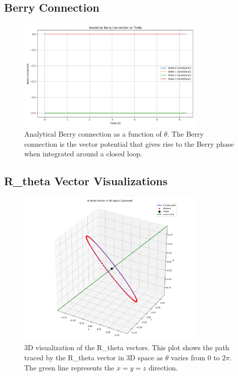\documentclass[12pt,a4paper]{article}
\begin{document}
\subsection{Berry Connection}

\begin{figure}[H]
    \centering
    \includegraphics[width=0.8\textwidth]{improved_berry_phase_results/analytical_berry_connection.png}
    \caption{Analytical Berry connection as a function of $\theta$. The Berry connection is the vector potential that gives rise to the Berry phase when integrated around a closed loop.}
    \label{fig:analytical_berry_connection}
\end{figure}

\subsection{R\_theta Vector Visualizations}

\begin{figure}[H]
    \centering
    \includegraphics[width=0.8\textwidth]{improved_berry_phase_results/r_theta_3d.png}
    \caption{3D visualization of the R\_theta vectors. This plot shows the path traced by the R\_theta vector in 3D space as $\theta$ varies from 0 to $2\pi$. The green line represents the $x=y=z$ direction.}
    \label{fig:r_theta_3d}
\end{figure}
\end{document}
